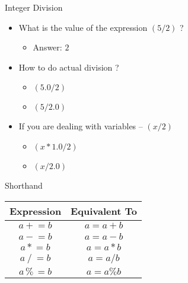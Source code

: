 \begin{frame}[fragile]{Integer Division}{}
    \begin{itemize}
        \item What is the value of the expression $(5/2)$ ?
        \begin{itemize}
            \item Answer: $2$
        \end{itemize}
        \item How to do actual division ?
        \begin{itemize}
            \item $(5.0/2)$
            \item $(5/2.0)$
        \end{itemize}
        \item If you are dealing with variables -- $(x/2)$
        \begin{itemize}
            \item $(x*1.0/2)$
            \item $(x/2.0)$
        \end{itemize}
    \end{itemize}
\end{frame}

\begin{frame}[fragile]{Shorthand}{}
    \Large
    \begin{table}[]
    \centering
    \begin{tabular}{cc}
    \hline
    \textbf{Expression} & \textbf{Equivalent To} \\ \hline
    $a \mathrel+= b $          & $a = a + b $        \\ \hline
    $a \mathrel-= b $          & $a = a - b $        \\ \hline
    $a \mathrel*= b $          & $a = a * b $        \\ \hline
    $a \mathrel/= b $          & $a = a / b $        \\ \hline
    $a \mathrel\%= b$          & $a = a \% b$        \\ \hline
    \end{tabular}
    \end{table}
\end{frame}

